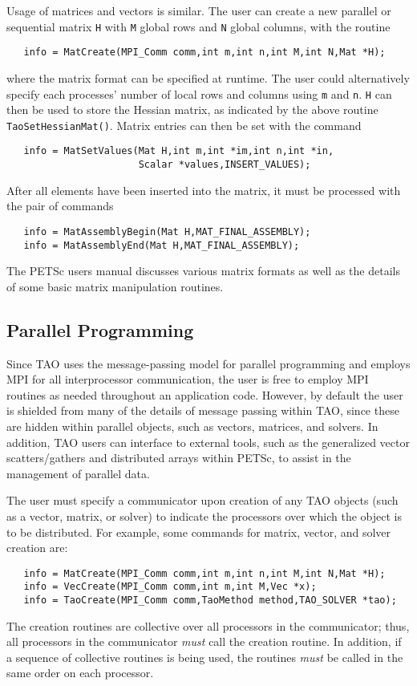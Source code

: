 Usage of matrices and vectors is similar.  
The user can create a new parallel or sequential matrix \texttt{H} with 
\texttt{M} global rows and \texttt{N} global columns, with the routine
\begin{verbatim}
   info = MatCreate(MPI_Comm comm,int m,int n,int M,int N,Mat *H);
\end{verbatim}
\noindent
where the matrix format can be specified at runtime.  The user could
alternatively specify each processes' number of local rows and columns
using \texttt{m} and \texttt{n}.  \texttt{H} can then be used to store
the Hessian matrix, as indicated by the above routine
\texttt{TaoSetHessianMat()}.  Matrix entries can then be set with the
command
\begin{verbatim}
   info = MatSetValues(Mat H,int m,int *im,int n,int *in,
                       Scalar *values,INSERT_VALUES);
\end{verbatim}
\noindent
After %
all elements have been inserted into the
matrix, it must be processed with the pair of commands
\begin{verbatim}
   info = MatAssemblyBegin(Mat H,MAT_FINAL_ASSEMBLY);
   info = MatAssemblyEnd(Mat H,MAT_FINAL_ASSEMBLY);
\end{verbatim}
\noindent
The PETSc users manual discusses various matrix formats as
well as the details of some basic matrix manipulation routines.

\subsection*{Parallel Programming}

Since TAO uses the message-passing model for parallel programming and
employs MPI for all interprocessor communication, the user is free to
employ MPI routines as needed throughout an application code.
However, by default the user is shielded from many of the details of
message passing within TAO, since these are hidden within parallel
objects, such as vectors, matrices, and solvers.  In addition, TAO
users can interface to external tools, such as the generalized vector
scatters/gathers and distributed arrays within PETSc, to assist in the
management of parallel data.

The user must specify a communicator
upon creation of any TAO objects (such as a vector, matrix, or solver)
to indicate the processors over which the object is to be distributed.
For example, some commands for matrix, vector, and solver creation
are:
\begin{verbatim}
   info = MatCreate(MPI_Comm comm,int m,int n,int M,int N,Mat *H);
   info = VecCreate(MPI_Comm comm,int m,int M,Vec *x);
   info = TaoCreate(MPI_Comm comm,TaoMethod method,TAO_SOLVER *tao); 
\end{verbatim}
\noindent
The creation routines are collective over all processors in the
communicator; thus, all processors in the communicator {\em must} call
the creation routine.  In addition, if a sequence of collective
routines is being used, the routines {\em must} be called in the same
order on each processor.

